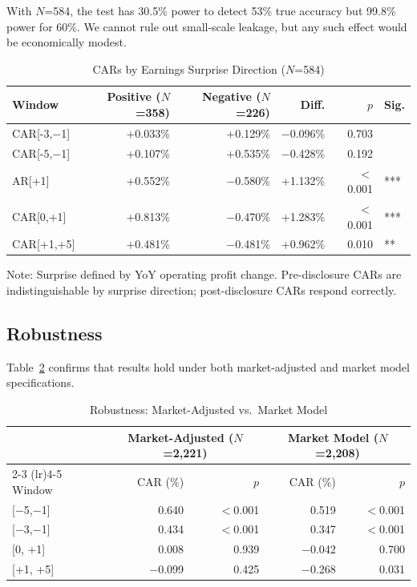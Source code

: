 \documentclass[manuscript,review]{acmart}
\begin{document}
With $N$=584, the test has 30.5\% power to detect 53\% true accuracy but 99.8\% power for 60\%. We cannot rule out small-scale leakage, but any such effect would be economically modest.

\begin{table}[ht]
\caption{CARs by Earnings Surprise Direction ($N$=584)}
\label{tab:surprise}
\begin{tabular}{lrrrrl}
\toprule
Window & Positive ($N$=358) & Negative ($N$=226) & Diff. & $p$ & Sig. \\
\midrule
CAR[-3,$-$1] & +0.033\% & +0.129\% & $-$0.096\% & 0.703 & \\
CAR[-5,$-$1] & +0.107\% & +0.535\% & $-$0.428\% & 0.192 & \\
\midrule
AR[+1] & +0.552\% & $-$0.580\% & +1.132\% & $<$0.001 & *** \\
CAR[0,+1] & +0.813\% & $-$0.470\% & +1.283\% & $<$0.001 & *** \\
CAR[+1,+5] & +0.481\% & $-$0.481\% & +0.962\% & 0.010 & ** \\
\bottomrule
\end{tabular}
\begin{flushleft}
\small Note: Surprise defined by YoY operating profit change. Pre-disclosure CARs are indistinguishable by surprise direction; post-disclosure CARs respond correctly.
\end{flushleft}
\end{table}

\subsection{Robustness}

Table~\ref{tab:robustness} confirms that results hold under both market-adjusted and market model specifications.

\begin{table}[ht]
\caption{Robustness: Market-Adjusted vs.\ Market Model}
\label{tab:robustness}
\begin{tabular}{lrrrr}
\toprule
& \multicolumn{2}{c}{Market-Adjusted ($N$=2,221)} & \multicolumn{2}{c}{Market Model ($N$=2,208)} \\
\cmidrule(lr){2-3} \cmidrule(lr){4-5}
Window & CAR (\%) & $p$ & CAR (\%) & $p$ \\
\midrule
{[}$-$5,$-$1{]} & 0.640 & $<$0.001 & 0.519 & $<$0.001 \\
{[}$-$3,$-$1{]} & 0.434 & $<$0.001 & 0.347 & $<$0.001 \\
{[}0, +1{]} & 0.008 & 0.939 & $-$0.042 & 0.700 \\
{[}+1, +5{]} & $-$0.099 & 0.425 & $-$0.268 & 0.031 \\
\bottomrule
\end{tabular}
\end{table}
\end{document}
